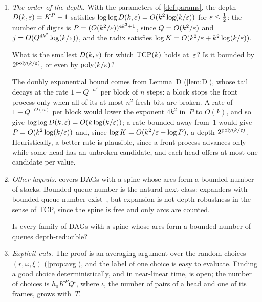 \begin{enumerate}[label=\arabic*.,leftmargin=2em]
\item \emph{The order of the depth.} With the parameters of \cref{def:params}, the depth $D(k,\varepsilon)=K^P-1$ satisfies
$\log\log D(k,\varepsilon)=O(k^2\log(k/\varepsilon))$ for $\varepsilon\le\frac12$: the number of digits is $P=(O(k^2/\varepsilon))^{4k^2+1}$, since
$Q=O(k^2/\varepsilon)$ and $j=O(Q^{4k^2}\log(k/\varepsilon))$, and the radix satisfies $\log K=O(k^2/\varepsilon+k^2\log(k/\varepsilon))$.
\begin{problem}\label{prob:depth}
What is the smallest $D(k,\varepsilon)$ for which $\mathrm{TCP}(k)$ holds at~$\varepsilon$? Is it bounded by $2^{\operatorname{poly}(k/\varepsilon)}$, or even by
$\operatorname{poly}(k/\varepsilon)$?
\end{problem}
The doubly exponential bound comes from Lemma~D (\cref{lem:D}), whose tail decays at the rate $1-Q^{-n^2}$ per block of $n$
steps: a block stops the front process only when all of its at most $n^2$ fresh bits are broken. A rate of $1-Q^{-O(n)}$ per
block would lower the exponent $4k^2$ in~$P$ to $O(k)$, and so give $\log\log D(k,\varepsilon)=O(k\log(k/\varepsilon))$; a rate bounded away
from~$1$ would give $P=O(k^2\log(k/\varepsilon))$ and, since $\log K=O(k^2/\varepsilon+\log P)$, a depth $2^{\operatorname{poly}(k/\varepsilon)}$. Heuristically, a
better rate is plausible, since a front process advances only while some head has an unbroken candidate, and each head offers
at most one candidate per value.

\item \emph{Other layouts.}  covers DAGs with a spine whose arcs form a bounded number of stacks. Bounded queue
number is the natural next class: expanders with bounded queue number exist~\cite{DSW2016}, but expansion is not
depth-robustness in the sense of TCP, since the spine is free and only arcs are counted.
\begin{problem}[Queues]\label{prob:queues}
Is every family of DAGs with a spine whose arcs form a bounded number of queues depth-reducible?
\end{problem}

\item \emph{Explicit cuts.} The proof is an averaging argument over the random choices $(r,\omega,\xi)$ (\cref{prop:avg}), and
the label of one choice is easy to evaluate. Finding a good choice deterministically, and in near-linear time, is open; the
number of choices is $h_0K^PQ^{\iota}$, where $\iota$, the number of pairs of a head and one of its frames, grows with~$T$.
\end{enumerate}
